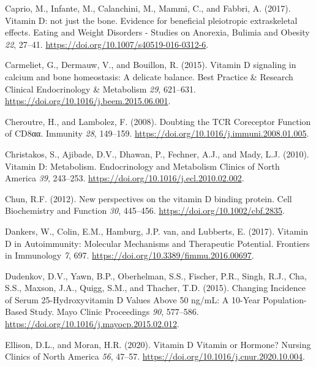 \documentclass[
  letterpaper,
  DIV=11,
  numbers=noendperiod]{scrartcl}
\newlength{\cslhangindent}
\newlength{\cslentryspacingunit} %
\newenvironment{CSLReferences}[2] %
 {%
  \setlength{\parindent}{0pt}
  \ifodd #1
  \let\oldpar\par
  \def\par{\hangindent=\cslhangindent\oldpar}
  \fi
  \setlength{\parskip}{#2\cslentryspacingunit}
 }%
 {}
\begin{document}
\begin{CSLReferences}{0}{0}
\leavevmode{}%
Caprio, M., Infante, M., Calanchini, M., Mammi, C., and Fabbri, A.
(2017). {Vitamin D: not just the bone. Evidence for beneficial
pleiotropic extraskeletal effects}. Eating and Weight Disorders -
Studies on Anorexia, Bulimia and Obesity \emph{22}, 27--41.
\url{https://doi.org/10.1007/s40519-016-0312-6}.

\leavevmode{}%
Carmeliet, G., Dermauw, V., and Bouillon, R. (2015). {Vitamin D
signaling in calcium and bone homeostasis: A delicate balance}. Best
Practice \& Research Clinical Endocrinology \& Metabolism \emph{29},
621--631. \url{https://doi.org/10.1016/j.beem.2015.06.001}.

\leavevmode{}%
Cheroutre, H., and Lambolez, F. (2008). {Doubting the TCR Coreceptor
Function of CD8αα}. Immunity \emph{28}, 149--159.
\url{https://doi.org/10.1016/j.immuni.2008.01.005}.

\leavevmode{}%
Christakos, S., Ajibade, D.V., Dhawan, P., Fechner, A.J., and Mady, L.J.
(2010). {Vitamin D: Metabolism}. Endocrinology and Metabolism Clinics of
North America \emph{39}, 243--253.
\url{https://doi.org/10.1016/j.ecl.2010.02.002}.

\leavevmode{}%
Chun, R.F. (2012). {New perspectives on the vitamin D binding protein}.
Cell Biochemistry and Function \emph{30}, 445--456.
\url{https://doi.org/10.1002/cbf.2835}.

\leavevmode{}%
Dankers, W., Colin, E.M., Hamburg, J.P. van, and Lubberts, E. (2017).
{Vitamin D in Autoimmunity: Molecular Mechanisms and Therapeutic
Potential}. Frontiers in Immunology \emph{7}, 697.
\url{https://doi.org/10.3389/fimmu.2016.00697}.

\leavevmode{}%
Dudenkov, D.V., Yawn, B.P., Oberhelman, S.S., Fischer, P.R., Singh,
R.J., Cha, S.S., Maxson, J.A., Quigg, S.M., and Thacher, T.D. (2015).
{Changing Incidence of Serum 25-Hydroxyvitamin D Values Above 50 ng/mL:
A 10-Year Population-Based Study}. Mayo Clinic Proceedings \emph{90},
577--586. \url{https://doi.org/10.1016/j.mayocp.2015.02.012}.

\leavevmode{}%
Ellison, D.L., and Moran, H.R. (2020). {Vitamin D Vitamin or Hormone?}
Nursing Clinics of North America \emph{56}, 47--57.
\url{https://doi.org/10.1016/j.cnur.2020.10.004}.


\end{CSLReferences}
\end{document}
